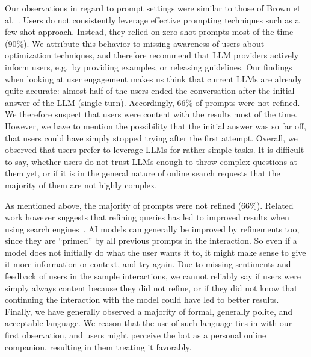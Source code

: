 Our observations in regard to prompt settings were similar to those of Brown et al.~\cite{brown_language_2020}.
Users do not consistently leverage effective prompting techniques such as a few shot approach.
Instead, they relied on zero shot prompts most of the time (90\%).
We attribute this behavior to missing awareness of users about optimization techniques, and
therefore recommend that LLM providers actively inform users, e.g.\ by
providing examples, or releasing guidelines.
Our findings when looking at user engagement makes us think that current LLMs are already
quite accurate: almost half of the users ended the conversation after the initial answer of
the LLM (single turn).
Accordingly, 66\% of prompts were not refined.
We therefore suspect that users were content with the results most of the time.
However, we have to mention the possibility that the initial answer was so far off,
that users could have simply stopped trying after the first attempt.
Overall, we observed that users prefer to leverage LLMs for rather simple tasks.
It is difficult to say, whether users do not trust LLMs enough to throw complex questions at
them yet, or if it is in the general nature of online search requests that the majority of
them are not highly complex.

As mentioned above, the majority of prompts were not refined (66\%).
Related work however suggests that refining queries has led to improved results when using search
engines~\cite{huang_analyzing_2009}.
AI models can generally be improved by refinements too, since they are “primed” by all previous
prompts in the interaction.
So even if a model does not initially do what the user wants it to, it might make
sense to give it more information or context, and try again.
Due to missing sentiments and feedback of users in the sample interactions, we cannot reliably say
if users were simply always content because they did not refine, or if they did not know that
continuing the interaction with the model could have led to better results.
Finally, we have generally observed a majority of formal, generally polite, and acceptable language.
We reason that the use of such language ties in with our first observation, and users might perceive
the bot as a personal online companion, resulting in them treating it favorably.

